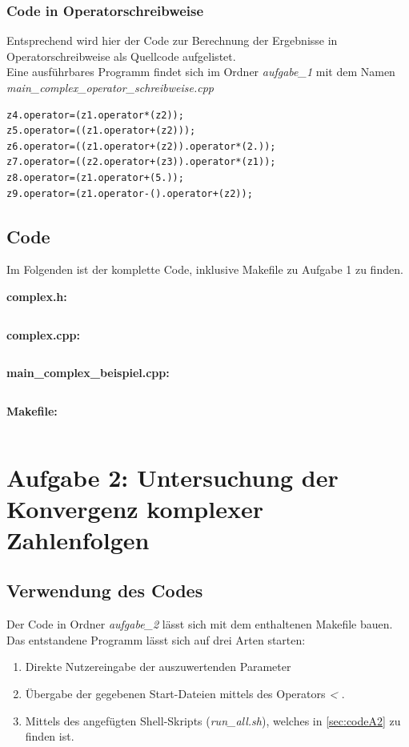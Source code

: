 \documentclass{report}
\begin{document}
\subsection{Code in Operatorschreibweise}

Entsprechend  wird hier der Code zur Berechnung der Ergebnisse in Operatorschreibweise als Quellcode aufgelistet. \\
Eine ausführbares Programm findet sich im Ordner \textit{aufgabe\_1} mit dem Namen \textit{main\_complex\_operator\_schreibweise.cpp}


\begin{lstlisting}
z4.operator=(z1.operator*(z2));
z5.operator=((z1.operator+(z2)));
z6.operator=((z1.operator+(z2)).operator*(2.));
z7.operator=((z2.operator+(z3)).operator*(z1));
z8.operator=(z1.operator+(5.));
z9.operator=(z1.operator-().operator+(z2));
\end{lstlisting}



\section{Code}\label{sec:codeA1}

Im Folgenden ist der komplette Code, inklusive Makefile zu Aufgabe 1 zu finden.

\textbf{complex.h: }
\inputminted[autogobble]{C++}{complex_a1.h}

\clearpage{}
\textbf{complex.cpp: }
\inputminted[autogobble]{C++}{complex_a1.cpp}

\clearpage{}
\textbf{main\_complex\_beispiel.cpp: }
\inputminted[autogobble]{C++}{main_complex_beispiel_a1.cpp}

\clearpage{}
\textbf{Makefile: }
\inputminted[autogobble]{make}{Makefile_a1}


\chapter{Aufgabe 2: Untersuchung der Konvergenz komplexer Zahlenfolgen}

\section{Verwendung des Codes}\label{sec:verwendungA2}
Der Code in Ordner \textit{aufgabe\_2} lässt sich mit dem enthaltenen Makefile bauen.
Das entstandene Programm lässt sich auf drei Arten starten:

\begin{enumerate}
  \item Direkte Nutzereingabe der auszuwertenden Parameter
  \item Übergabe der gegebenen Start-Dateien mittels des Operators \textit{<} .
  \item Mittels des angefügten Shell-Skripts (\textit{run\_all.sh}), welches in \ref{sec:codeA2} zu finden ist.
\end{enumerate}
\end{document}
